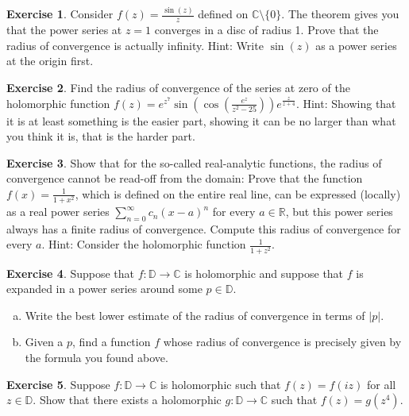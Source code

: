 \documentclass[12pt,openany]{book}
\newcommand{\sabs}[1]{\lvert {#1} \rvert}
\newcommand{\C}{{\mathbb{C}}}
\newcommand{\R}{{\mathbb{R}}}
\newcommand{\D}{{\mathbb{D}}}
\theoremstyle{plain}
\theoremstyle{remark}
\theoremstyle{definition}
\newenvironment{exbox}{%
    \def\FrameCommand{\vrule width 1pt \relax\hspace{10pt}}%
    \MakeFramed{\advance\hsize-\width\FrameRestore}%
}{%
    \endMakeFramed
}
\newenvironment{exparts}{%
    \leavevmode\begin{enumerate}[a),noitemsep,topsep=0pt,parsep=0pt,partopsep=0pt]
}{%
    \end{enumerate}
}
\theoremstyle{exercise}
\newtheorem{exercise}{Exercise}[section]
\theoremstyle{example}
\begin{document}
\begin{exbox}
\begin{exercise}
Consider $f(z) = \frac{\sin(z)}{z}$ defined on $\C \setminus \{ 0 \}$.
The theorem gives you that the power series at $z=1$ converges in a disc of
radius 1.  Prove that the radius of convergence is actually infinity.  Hint:
Write $\sin(z)$ as a power series at the origin first.
\end{exercise}

\begin{exercise}
Find the radius of convergence of the series at zero of the holomorphic
function $f(z) =
e^{z^7}\sin\left(\cos\left(\frac{e^z}{z^2-25}\right)\right)e^{\frac{z}{z+4}}$.
Hint: Showing that it is at least something is the easier part, showing it
can be no larger than what you think it is, that is the harder part.
\end{exercise}

\begin{exercise}\label{exercise:realradconvhard}
\pagebreak[2]
Show that for the so-called real-analytic functions, the radius of
convergence cannot be read-off from the domain:
Prove that the function $f(x) = \frac{1}{1+x^2}$,
which is defined on the
entire real line, can be expressed (locally) as a real power series
$\sum_{n=0}^\infty c_n {(x-a)}^n$ for every $a \in \R$, but
this power series always has a finite radius of convergence.
Compute this radius of convergence for every $a$.  Hint: Consider
the holomorphic function $\frac{1}{1+z^2}$.
\end{exercise}

\begin{exercise}
Suppose that $f \colon \D \to \C$ is holomorphic and suppose that
$f$ is expanded in a power series around some $p \in \D$.
\begin{exparts}
\item
Write the best lower estimate of the radius of convergence in terms of
$\sabs{p}$.
\item
Given a $p$, find a function $f$ whose radius of convergence is precisely
given by the formula you found above.
\end{exparts}
\end{exercise}

\begin{exercise}
Suppose $f \colon \D \to \C$ is holomorphic such that
$f(z) = f(iz)$ for all $z \in \D$.  Show that there
exists a holomorphic $g \colon \D \to \C$ such that
$f(z) = g(z^4)$.
\end{exercise}


\end{exbox}
\end{document}
